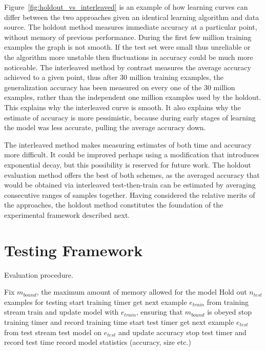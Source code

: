 Figure~\ref{fig:holdout_vs_interleaved} is an example of how learning curves can differ between the two approaches given an identical learning algorithm and data source. The holdout method measures immediate accuracy at a particular point, without memory of previous performance. During the first few million training examples the graph is not smooth. If the test set were small thus unreliable or the algorithm more unstable then fluctuations in accuracy could be much more noticeable. The interleaved method by contrast measures the average accuracy achieved to a given point, thus after 30 million training examples, the generalization accuracy has been measured on every one of the 30 million examples, rather than the independent one million examples used by the holdout. This explains why the interleaved curve is smooth. It also explains why the estimate of accuracy is more pessimistic, because during early stages of learning the model was less accurate, pulling the average accuracy down.

The interleaved method makes measuring estimates of both time and accuracy more difficult. It could be improved perhaps using a modification that introduces exponential decay, but this possibility is reserved for future work. The holdout evaluation method offers the best of both schemes, as the averaged accuracy that would be obtained via interleaved test-then-train can be estimated by averaging consecutive ranges of samples together. Having considered the relative merits of the approaches, the holdout method constitutes the foundation of the experimental framework described next.

\section{Testing Framework}
\label{sec:framework}

\begin{algorithm}
\caption{Evaluation procedure.}
\begin{algorithmic}
\STATE Fix $m_{bound}$, the maximum amount of memory allowed for the model
\STATE Hold out $n_{test}$ examples for testing
\STATE start training timer
\STATE get next example $e_{train}$ from training stream
\STATE train and update model with $e_{train}$, ensuring that $m_{bound}$ is obeyed
\ENDFOR
\STATE stop training timer and record training time
\STATE start test timer
\STATE get next example $e_{test}$ from test stream
\STATE test model on $e_{test}$ and update accuracy
\ENDFOR
\STATE stop test timer and record test time
\STATE record model statistics (accuracy, size etc.)
\ENDWHILE
\end{algorithmic}
\label{alg:eval}
\end{algorithm}

